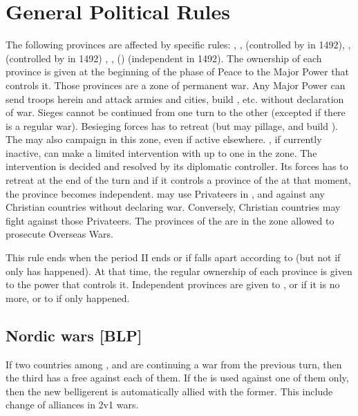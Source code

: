 
\section{General Political Rules}

\label{chSpecific:Balkans}

\aparag The following provinces are affected by specific rules:
, ,  (controlled by \TUR
in 1492), ,  (controlled by \VEN in 1492)
, ,  ()
(independent in 1492).
\aparag The ownership of each province is given at the beginning of the phase
of Peace to the Major Power that controls it.
\aparag Those provinces are a zone of permanent war. Any Major Power can send
troops herein and attack armies and cities, build \Presidios, etc.  without
declaration of war.
\bparag Sieges cannot be continued from one turn to the other (excepted if
there is a regular war). Besieging forces has to retreat (but may pillage, and
build \Presidios).
\bparag The \hab may also campaign in this zone, even if active elsewhere.
\bparag {}, if currently inactive, can make a limited intervention
with up to one \ARMY\faceplus in the zone. The intervention is decided and
resolved by its diplomatic controller. Its forces has to retreat at the end of
the turn and if it controls a province of the  at that moment,
the province becomes independent.
\aparag \TUR may use Privateers in ,  and 
against any Christian countries without declaring war.  Conversely, Christian
countries may fight against those Privateers.
\aparag The provinces of the  are in the zone allowed to
prosecute Overseas Wars.

\bparag This rule ends when the period II ends or if  falls
apart according to  (but not if only
 has happened).
\bparag At that time, the regular ownership of each province is given to the
power that controls it. Independent provinces are given to , or
 if it is no more, or to \HAB if only  happened.


\subsection{Nordic wars [BLP]}
\aparag If two countries among \POL, \RUS and \SUE are continuing a
war from the previous turn, then the third has a free \CB against each of
them.
\bparag If the \CB is used against one of them only, then the new belligerent
is automatically allied with the former.
\bparag This include change of alliances in 2v1 wars.

